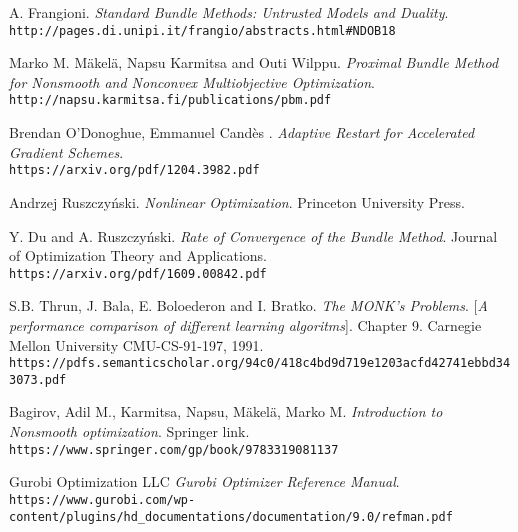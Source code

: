\begin{thebibliography}{9}
	A. Frangioni.
	\textit{Standard Bundle Methods: Untrusted Models and Duality}.
	\\\texttt{http://pages.di.unipi.it/frangio/abstracts.html\#NDOB18}
	
	Marko M. M\"akel\"a, Napsu Karmitsa and Outi Wilppu.
	\textit{Proximal Bundle Method for Nonsmooth and Nonconvex Multiobjective Optimization}.
	\\\texttt{http://napsu.karmitsa.fi/publications/pbm.pdf}
	
	Brendan O’Donoghue, Emmanuel Candès .
	\textit{Adaptive Restart for Accelerated Gradient Schemes}.
	\\\texttt{https://arxiv.org/pdf/1204.3982.pdf}
	
	Andrzej Ruszczyński.
	\textit{Nonlinear Optimization}. Princeton University Press. 
	
	Y. Du and A. Ruszczyński.
	\textit{Rate of Convergence of the Bundle Method}. Journal  of  Optimization Theory and Applications.
	\\\texttt{https://arxiv.org/pdf/1609.00842.pdf}


	S.B. Thrun, J. Bala, E. Boloederon and I. Bratko.
	\textit{The MONK's Problems}. 
	[\textit{A performance comparison of different learning algoritms}]. Chapter 9.
	Carnegie Mellon University CMU-CS-91-197, 1991.
	\\\texttt{https://pdfs.semanticscholar.org/94c0/418c4bd9d719e1203acfd42741ebbd343073.pdf}
	
	 Bagirov, Adil M., Karmitsa, Napsu, Mäkelä, Marko M.
	\textit{Introduction to Nonsmooth optimization}. Springer link.
	\\\texttt{https://www.springer.com/gp/book/9783319081137}	
	
	Gurobi Optimization LLC
	\textit{Gurobi Optimizer Reference Manual}.
	\\\texttt{https://www.gurobi.com/wp-content/plugins/hd\_documentations/documentation/9.0/refman.pdf}	
 

	
\end{thebibliography}